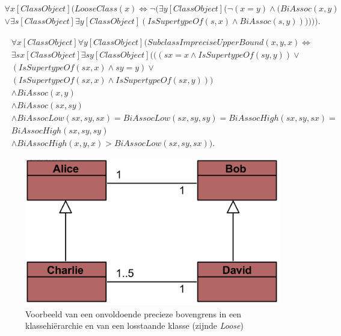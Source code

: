 \begin{align}
	\nonumber \forall{x}[ClassObject](LooseClass(x) \Leftrightarrow \lnot(\exists{y}[ClassObject](\lnot(x = y) \land (BiAssoc(x,y) \\ \lor \exists{s}[ClassObject]\exists{y}[ClassObject](\mathit{IsSupertypeOf}(s,x) \land BiAssoc(s,y)))))).\label{form:loose}
\end{align}

\begin{align}
	&\nonumber\forall{x}[ClassObject]\forall{y}[ClassObject](SubclassImpreciseUpperBound(x, y, x) \Leftrightarrow \\
	&\nonumber\exists{sx}[ClassObject]\exists{sy}[ClassObject]
	(((sx = x \land IsSupertypeOf(sy, y)) \lor \\
	&\nonumber(IsSupertypeOf(sx, x) \land sy = y) \lor \\
	&\nonumber(IsSupertypeOf(sx, x) \land IsSupertypeOf(sx, y))) \\
	&\nonumber\land BiAssoc(x, y) \\
	&\nonumber\land BiAssoc(sx, sy) \\
	&\nonumber\land BiAssocLow(sx, sy, sx) = BiAssocLow(sx, sy, sy) = BiAssocHigh(sx, sy, sx) = \\
	&\nonumber{}BiAssocHigh(sx, sy, sy) \\ 
	&\land BiAssocHigh(x, y, x) > BiAssocLow(sx, sy, sx))\label{form:imprecise-bound}.
\end{align}

\begin{figure}
	\centering
	\includegraphics{chap-kwaliteitsgebrek/hierarchy.png}
	\caption{Voorbeeld van een onvoldoende precieze bovengrens in een klassehi\"erarchie en van een losstaande klasse (zijnde \textit{Loose})}
	\label{fig:hierarchie}
\end{figure}

